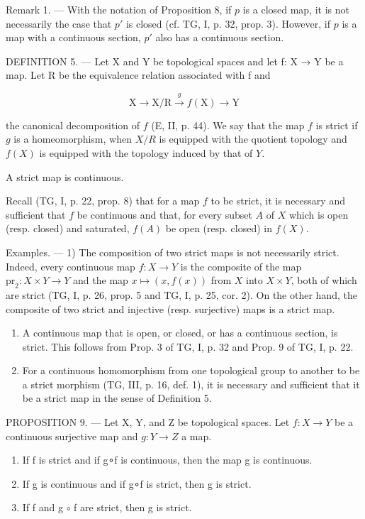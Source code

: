 Remark 1. --- With the notation of Proposition 8, if \(p\) is a closed map, it is not necessarily the case that \(p'\) is closed (cf. TG, I, p. 32, prop. 3). However, if \(p\) is a map with a continuous section, \(p'\) also has a continuous section.

DEFINITION 5. --- Let X and Y be topological spaces and let f: X → Y be a map. Let R be the equivalence relation associated with f and

\[
\mathrm{X} \rightarrow \mathrm{X} / \mathrm{R} \xrightarrow {g} f (\mathrm{X}) \rightarrow \mathrm{Y}
\]

the canonical decomposition of \(f\) (E, II, p. 44). We say that the map \(f\) is strict if \(g\) is a homeomorphism, when \(X/R\) is equipped with the quotient topology and \(f(X)\) is equipped with the topology induced by that of \(Y\).

A strict map is continuous.

Recall (TG, I, p. 22, prop. 8) that for a map \(f\) to be strict, it is necessary and sufficient that \(f\) be continuous and that, for every subset \(A\) of \(X\) which is open (resp. closed) and saturated, \(f(A)\) be open (resp. closed) in \(f(X)\).

Examples. --- 1) The composition of two strict maps is not necessarily strict. Indeed, every continuous map \(f \colon X \to Y\) is the composite of the map \(\mathrm{pr}_2 \colon X \times Y \to Y\) and the map \(x \mapsto (x, f(x))\) from \(X\) into \(X \times Y\), both of which are strict (TG, I, p. 26, prop. 5 and TG, I, p. 25, cor. 2). On the other hand, the composite of two strict and injective (resp. surjective) maps is a strict map.

\begin{enumerate}
\def\labelenumi{\arabic{enumi})}
\setcounter{enumi}{1}
\item
  A continuous map that is open, or closed, or has a continuous section, is strict. This follows from Prop. 3 of TG, I, p. 32 and Prop. 9 of TG, I, p. 22.
\item
  For a continuous homomorphism from one topological group to another to be a strict morphism (TG, III, p. 16, def. 1), it is necessary and sufficient that it be a strict map in the sense of Definition 5.
\end{enumerate}

PROPOSITION 9. --- Let X, Y, and Z be topological spaces. Let \(f\colon X \to Y\) be a continuous surjective map and \(g\colon Y \to Z\) a map.

\begin{enumerate}
\def\labelenumi{\alph{enumi})}
\item
If f is strict and if g∘f is continuous, then the map g is continuous.
\item
If g is continuous and if g∘f is strict, then g is strict.
\item
If f and g \(\circ\) f are strict, then g is strict.
\end{enumerate}

